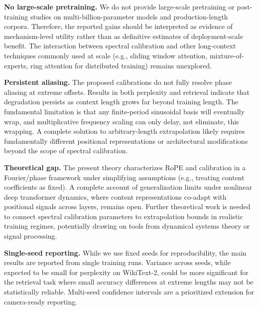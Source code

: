\documentclass[conference]{IEEEtran}
\begin{document}
\textbf{No large-scale pretraining.} We do not provide large-scale pretraining or post-training studies on multi-billion-parameter models and production-length corpora. Therefore, the reported gains should be interpreted as evidence of mechanism-level utility rather than as definitive estimates of deployment-scale benefit. The interaction between spectral calibration and other long-context techniques commonly used at scale (e.g., sliding window attention, mixture-of-experts, ring attention for distributed training) remains unexplored.

\textbf{Persistent aliasing.} The proposed calibrations do not fully resolve phase aliasing at extreme offsets. Results in both perplexity and retrieval indicate that degradation persists as context length grows far beyond training length. The fundamental limitation is that any finite-period sinusoidal basis will eventually wrap, and multiplicative frequency scaling can only delay, not eliminate, this wrapping. A complete solution to arbitrary-length extrapolation likely requires fundamentally different positional representations or architectural modifications beyond the scope of spectral calibration.

\textbf{Theoretical gap.} The present theory characterizes RoPE and calibration in a Fourier/phase framework under simplifying assumptions (e.g., treating content coefficients as fixed). A complete account of generalization limits under nonlinear deep transformer dynamics, where content representations co-adapt with positional signals across layers, remains open. Further theoretical work is needed to connect spectral calibration parameters to extrapolation bounds in realistic training regimes, potentially drawing on tools from dynamical systems theory or signal processing.

\textbf{Single-seed reporting.} While we use fixed seeds for reproducibility, the main results are reported from single training runs. Variance across seeds, while expected to be small for perplexity on WikiText-2, could be more significant for the retrieval task where small accuracy differences at extreme lengths may not be statistically reliable. Multi-seed confidence intervals are a prioritized extension for camera-ready reporting.
\end{document}
